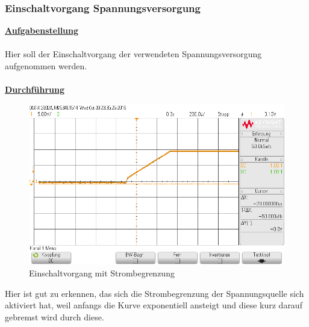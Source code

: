 \documentclass[a4paper,12pt]{article}
\begin{document}
	\subsubsection{Einschaltvorgang Spannungsversorgung}
	\underline{\textbf{Aufgabenstellung}} \\ \\
	Hier soll der Einschaltvorgang der verwendeten Spannungsversorgung aufgenommen werden. \\ \\
	\underline{\textbf{Durchführung}}
	\begin{figure}[h]
		\centering
		\includegraphics[width=12cm]{img/Einschaltvorgang}
		\caption{Einschaltvorgang mit Strombegrenzung}
	\end{figure}
    \newline
    Hier ist gut zu erkennen, das sich die Strombegrenzung der Spannungsquelle sich aktiviert hat, weil anfangs die Kurve exponentiell ansteigt und diese kurz darauf gebremst wird durch diese.
    \newpage
\end{document}
